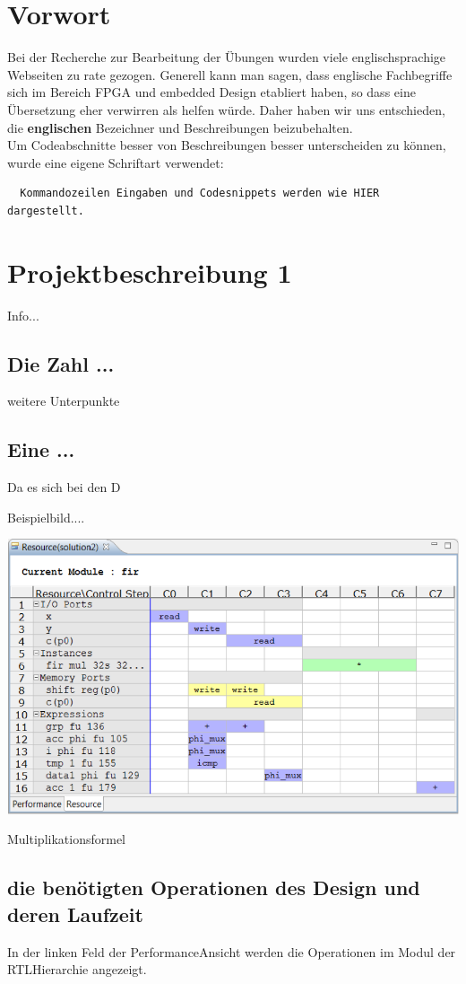 \section{Vorwort}
Bei der Recherche zur Bearbeitung der Übungen wurden viele englischsprachige Webseiten zu rate gezogen. Generell kann man sagen, dass englische Fachbegriffe sich im Bereich FPGA und embedded Design etabliert haben, so dass eine Übersetzung eher verwirren als helfen würde. Daher haben wir uns entschieden, die \textbf{englischen} Bezeichner und Beschreibungen beizubehalten.\\
Um Codeabschnitte besser von Beschreibungen besser unterscheiden zu können, wurde eine eigene Schriftart verwendet:
\begin{verbatim}
  Kommandozeilen Eingaben und Codesnippets werden wie HIER dargestellt.
\end{verbatim}


\section{Projektbeschreibung 1} \label{ex1}
Info...


\subsection {Die Zahl ...}
weitere Unterpunkte

\subsection {Eine ...}
Da es sich bei den D


Beispielbild....

\begin{minipage}{\textwidth}
    \begin{center}        
        \includegraphics[scale=0.7]{img/Resource.png} 
    \end{center}
\end{minipage}
\begin{center}
Multiplikationsformel
\end{center}

\subsection {die benötigten Operationen des Design und deren Laufzeit}
In der linken Feld der Performance\-Ansicht werden die Operationen im Modul der RTL\-Hierarchie angezeigt.\\


